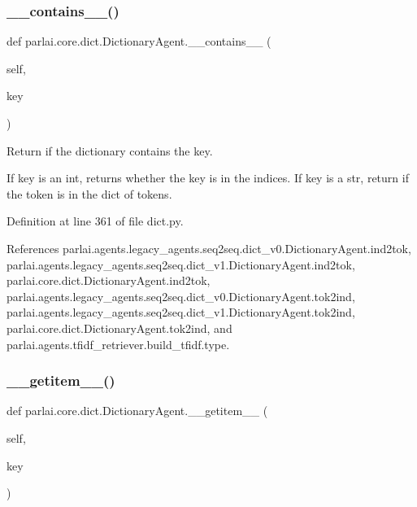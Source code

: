\subsubsection{\texorpdfstring{\+\_\+\+\_\+contains\+\_\+\+\_\+()}{\_\_contains\_\_()}}
{\footnotesize\ttfamily def parlai.\+core.\+dict.\+Dictionary\+Agent.\+\_\+\+\_\+contains\+\_\+\+\_\+ (\begin{DoxyParamCaption}\item[{}]{self,  }\item[{}]{key }\end{DoxyParamCaption})}

\begin{DoxyVerb}Return if the dictionary contains the key.

If key is an int, returns whether the key is in the indices.
If key is a str, return if the token is in the dict of tokens.
\end{DoxyVerb}
 

Definition at line 361 of file dict.\+py.



References parlai.\+agents.\+legacy\+\_\+agents.\+seq2seq.\+dict\+\_\+v0.\+Dictionary\+Agent.\+ind2tok, parlai.\+agents.\+legacy\+\_\+agents.\+seq2seq.\+dict\+\_\+v1.\+Dictionary\+Agent.\+ind2tok, parlai.\+core.\+dict.\+Dictionary\+Agent.\+ind2tok, parlai.\+agents.\+legacy\+\_\+agents.\+seq2seq.\+dict\+\_\+v0.\+Dictionary\+Agent.\+tok2ind, parlai.\+agents.\+legacy\+\_\+agents.\+seq2seq.\+dict\+\_\+v1.\+Dictionary\+Agent.\+tok2ind, parlai.\+core.\+dict.\+Dictionary\+Agent.\+tok2ind, and parlai.\+agents.\+tfidf\+\_\+retriever.\+build\+\_\+tfidf.\+type.

\mbox{\label{classparlai_1_1core_1_1dict_1_1DictionaryAgent_a82a64989f1750412b6ffd9a4270953b3}} 
\subsubsection{\texorpdfstring{\+\_\+\+\_\+getitem\+\_\+\+\_\+()}{\_\_getitem\_\_()}}
{\footnotesize\ttfamily def parlai.\+core.\+dict.\+Dictionary\+Agent.\+\_\+\+\_\+getitem\+\_\+\+\_\+ (\begin{DoxyParamCaption}\item[{}]{self,  }\item[{}]{key }\end{DoxyParamCaption})}

